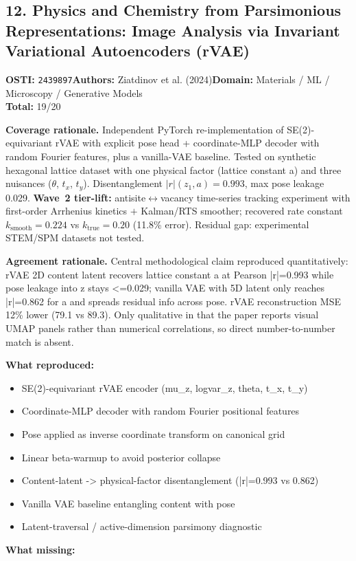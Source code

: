 \subsection{12. Physics and Chemistry from Parsimonious Representations: Image Analysis via Invariant Variational Autoencoders (rVAE)}
\textbf{OSTI:} \texttt{2439897}\quad\textbf{Authors:} Ziatdinov et al. (2024)\quad\textbf{Domain:} Materials / ML / Microscopy / Generative Models\\
\quad{}\quad\textbf{Total:} 19/20\par\smallskip
\noindent\textbf{Coverage rationale.} Independent PyTorch re-implementation of SE(2)-equivariant rVAE with explicit pose head + coordinate-MLP decoder with random Fourier features, plus a vanilla-VAE baseline. Tested on synthetic hexagonal lattice dataset with one physical factor (lattice constant a) and three nuisances ($\theta$, $t_x$, $t_y$). Disentanglement $|r|(z_1, a)=0.993$, max pose leakage 0.029. \textbf{Wave~2 tier-lift:} antisite$\leftrightarrow$vacancy time-series tracking experiment with first-order Arrhenius kinetics $+$ Kalman/RTS smoother; recovered rate constant $k_{\mathrm{smooth}}=0.224$ vs $k_{\mathrm{true}}=0.20$ (11.8\% error). Residual gap: experimental STEM/SPM datasets not tested.\par
\noindent\textbf{Agreement rationale.} Central methodological claim reproduced quantitatively: rVAE 2D content latent recovers lattice constant a at Pearson |r|=0.993 while pose leakage into z stays \textless{}=0.029; vanilla VAE with 5D latent only reaches |r|=0.862 for a and spreads residual info across pose. rVAE reconstruction MSE 12\% lower (79.1 vs 89.3). Only qualitative in that the paper reports visual UMAP panels rather than numerical correlations, so direct number-to-number match is absent.\par\smallskip
\noindent\textbf{What reproduced:}
\begin{itemize}[leftmargin=1.4em,itemsep=0.2em,topsep=0.2em]
\item SE(2)-equivariant rVAE encoder (mu\_z, logvar\_z, theta, t\_x, t\_y)
\item Coordinate-MLP decoder with random Fourier positional features
\item Pose applied as inverse coordinate transform on canonical grid
\item Linear beta-warmup to avoid posterior collapse
\item Content-latent -\textgreater{} physical-factor disentanglement (|r|=0.993 vs 0.862)
\item Vanilla VAE baseline entangling content with pose
\item Latent-traversal / active-dimension parsimony diagnostic
\end{itemize}\noindent\textbf{What missing:}

